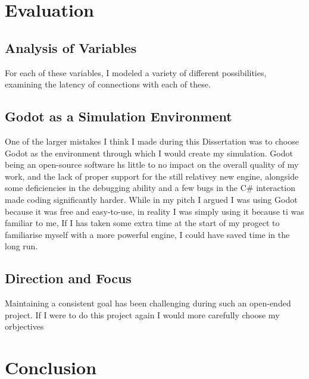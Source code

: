 \documentclass[12pt]{article}
\begin{document}
\section{Evaluation}

\subsection{Analysis of Variables}
For each of these variables, I modeled a variety of different possibilities, examining the latency of connections with each of these.


\subsection{Godot as a Simulation Environment}

One of the larger mistakes I think I made during this Dissertation was to choose Godot as the environment through which I would create my simulation. Godot being an open-source software hs little to no impact on the overall quality of my work, and the lack of proper support for the still relativey new engine, alongside some deficiencies in the debugging ability and a few bugs in the C\# interaction made coding significantly harder. While in my pitch I argued I was using Godot because it was free and easy-to-use, in reality I was simply using it because ti was familiar to me, If I has taken some extra time at the start of my progect to familiarise myself with a more powerful engine, I could have saved time in the long run.

\subsection{Direction and Focus}

Maintaining a consistent goal has been challenging during such an open-ended project. If I were to do this project again I would more carefully choose my orbjectives %

\section{Conclusion}

\end{document}
